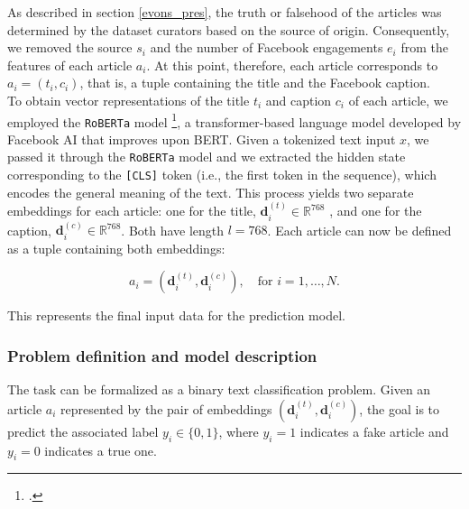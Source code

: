 \documentclass[a4paper,twoside,12pt]{book}
\begin{document}
As described in section \ref{evons_pres}, the truth or falsehood of the articles was determined by the dataset curators based on the source of origin. Consequently, we removed the source $s_i$ and the number of Facebook engagements $e_i$ from the features of each article $a_i$. At this point, therefore, each article corresponds to $a_i = (t_i, c_i)$, that is, a tuple containing the title and the Facebook caption. \\

To obtain vector representations of the title $t_i$ and caption $c_i$ of each article, we employed the \texttt{RoBERTa} model \footcite{liu2019}, a transformer-based language model developed by Facebook AI that improves upon BERT. 
Given a tokenized text input $x$, we passed it through the \texttt{RoBERTa} model and we extracted the hidden state corresponding to the \texttt{[CLS]} token (i.e., the first token in the sequence), which encodes the general meaning of the text. This process yields two separate embeddings for each article: one for the title, $\mathbf{d}^{(t)}_i \in \mathbb{R}^{768}$ , and one for the caption, $\mathbf{d}^{(c)}_i \in \mathbb{R}^{768}$. Both have length $l=768$. Each article can now be defined as a tuple containing both embeddings:

\[
a_i = (\mathbf{d}^{(t)}_i, \mathbf{d}^{(c)}_i), \quad \text{for } i = 1, \dots, N.
\]

This represents the final input data for the prediction model.

\subsubsection*{Problem definition and model description} \label{evons_detection}

The task can be formalized as a binary text classification problem. 
Given an article $a_i$ represented by the pair of embeddings $(\mathbf{d}^{(t)}_i, \mathbf{d}^{(c)}_i)$, the goal is to predict the associated label $y_i \in \{0,1\}$, where $y_i = 1$ indicates a fake article and $y_i = 0$ indicates a true one.
\end{document}
